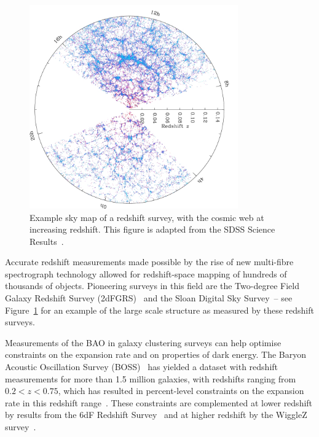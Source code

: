 \begin{figure}[!ht]
	\centering
	\includegraphics[width=0.8\textwidth]{fig/sdss.png}
	\caption{Example sky map of a redshift survey, with the cosmic web at increasing redshift. This figure is adapted from the SDSS Science Results~\cite{SDSS:2018ws}.}
	\label{fig:redshiftsurveypicture}
\end{figure}

Accurate redshift measurements made possible by the rise of new multi-fibre spectrograph technology allowed for redshift-space mapping of hundreds of thousands of objects. Pioneering surveys in this field are the Two-degree Field Galaxy Redshift Survey (2dFGRS)~\cite{2DFGRS:2001zay} and the Sloan Digital Sky Survey~\cite{SDSS:2000hjo}-- see Figure~\ref{fig:redshiftsurveypicture} for an example of the large scale structure as measured by these redshift surveys.

Measurements of the BAO in galaxy clustering surveys can help optimise constraints on the expansion rate and on properties of dark energy. The Baryon Acoustic Oscillation Survey (BOSS)~\cite{Dawson:2012} has yielded a dataset with redshift measurements for more than 1.5 million galaxies, with redshifts ranging from $0.2 < z < 0.75$, which has resulted in percent-level constraints on the expansion rate in this redshift range~\cite{BOSS:2016wmc}. These constraints are complemented at lower redshift by results from the 6dF Redshift Survey~\cite{Beutler:2011} and at higher redshift by the WiggleZ survey~\cite{Blake:2011a,Blake:2011b}. 

